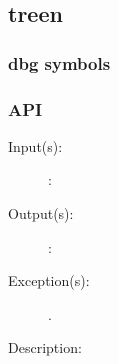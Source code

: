 %
%
%
%
%              

\subsection{treen}
\label{treen}

\subsubsection{dbg symbols}

\subsubsection{API}
\begin{description}
\label{treen_}
\item[{\cfunc[]{treen\_}{}}: ]
	\begin{description}\item[]
	\item[Input(s): ]
		\begin{description}\item[]
		\item[: ]
		\end{description}
	\item[Output(s): ]
		\begin{description}\item[]
		\item[: ]
		\end{description}
	\item[Exception(s): ]
		\begin{description}\item[]
		\item[.]
		\end{description}
	\item[Description: ]
	\end{description}
\end{description}
